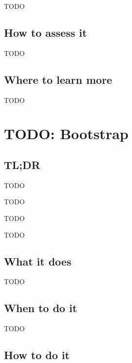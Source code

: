 \documentclass[
]{book}
\providecommand{\tightlist}{%
  \setlength{\itemsep}{0pt}\setlength{\parskip}{0pt}}
\begin{document}
TODO

\hypertarget{how-to-assess-it-8}{%
\section{How to assess it}\label{how-to-assess-it-8}}

TODO

\hypertarget{where-to-learn-more-8}{%
\section{Where to learn more}\label{where-to-learn-more-8}}

TODO

\hypertarget{bootstrap}{%
\chapter{TODO: Bootstrap}\label{bootstrap}}

\hypertarget{tldr-9}{%
\section{TL;DR}\label{tldr-9}}

\begin{description}
\tightlist
\item[What it does]
TODO
\item[When to do it]
TODO
\item[How to do it]
TODO
\item[How to assess it]
TODO
\end{description}

\hypertarget{what-it-does-9}{%
\section{What it does}\label{what-it-does-9}}

TODO

\hypertarget{when-to-do-it-9}{%
\section{When to do it}\label{when-to-do-it-9}}

TODO

\hypertarget{how-to-do-it-9}{%
\section{How to do it}\label{how-to-do-it-9}}
\end{document}
